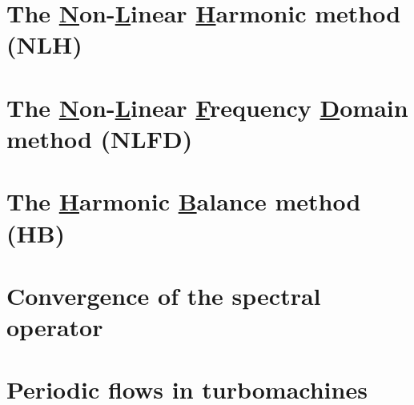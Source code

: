 \section{The \texorpdfstring{\underline{N}}{N}on-\texorpdfstring{\underline{L}}{L}inear 
\texorpdfstring{\underline{H}}{H}armonic method (NLH)}
\label{sub:sm_nlh}


\section{The \texorpdfstring{\underline{N}}{N}on-\texorpdfstring{\underline{L}}{L}inear 
\texorpdfstring{\underline{F}}{F}requency \texorpdfstring{\underline{D}}{D}omain method (NLFD)}
\label{sub:sm_nlfd}


\section{The \texorpdfstring{\underline{H}}{H}armonic \texorpdfstring{\underline{B}}{B}alance method (HB)}
\label{sec:sm_hb}


\section{Convergence of the spectral operator}
\label{sec:spectral_accuracy}


\section{Periodic flows in turbomachines}
\label{sec:sm_hudson}


